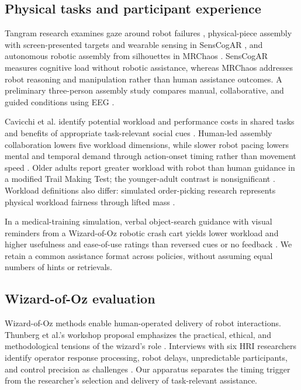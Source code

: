 \documentclass[sigconf,anonymous]{aamas}
\begin{document}
\subsection{Physical tasks and participant experience}

Tangram research examines gaze around robot failures \cite{tabatabaei2025}, physical-piece assembly with screen-presented targets and wearable sensing in SensCogAR \cite{melo2026}, and autonomous robotic assembly from silhouettes in MRChaos \cite{zhao2025}. SensCogAR measures cognitive load without robotic assistance, whereas MRChaos addresses robot reasoning and manipulation rather than human assistance outcomes. A preliminary three-person assembly study compares manual, collaborative, and guided conditions using EEG \cite{caiazzo2024}.

Cavicchi et al. identify potential workload and performance costs in shared tasks and benefits of appropriate task-relevant social cues \cite{cavicchi2025}. Human-led assembly collaboration lowers five workload dimensions, while slower robot pacing lowers mental and temporal demand through action-onset timing rather than movement speed \cite{vandijk2023}. Older adults report greater workload with robot than human guidance in a modified Trail Making Test; the younger-adult contrast is nonsignificant \cite{varrasi2026}. Workload definitions also differ: simulated order-picking research represents physical workload fairness through lifted mass \cite{smit2024}.

In a medical-training simulation, verbal object-search guidance with visual reminders from a Wizard-of-Oz robotic crash cart yields lower workload and higher usefulness and ease-of-use ratings than reversed cues or no feedback \cite{tanjim2025}. We retain a common assistance format across policies, without assuming equal numbers of hints or retrievals.

\subsection{Wizard-of-Oz evaluation}

Wizard-of-Oz methods enable human-operated delivery of robot interactions. Thunberg et al.'s workshop proposal emphasizes the practical, ethical, and methodological tensions of the wizard's role \cite{thunberg2026}. Interviews with six HRI researchers identify operator response processing, robot delays, unpredictable participants, and control precision as challenges \cite{bejarano2024}. Our apparatus separates the timing trigger from the researcher's selection and delivery of task-relevant assistance.
\end{document}
